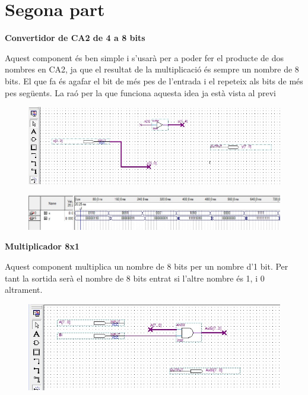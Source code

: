 \documentclass[12pt, a4papre]{article}
\begin{document}
	\newpage
	\section{Segona part}
	\textbf{\large{Convertidor de CA2 de 4 a 8 bits}}
	
	Aquest component és ben simple i s'usarà per a poder fer el producte de dos nombres en CA2, ja que el resultat de la multiplicació és sempre un nombre de 8 bits. El que fa és agafar el bit de més pes de l'entrada i el repeteix als bits de més pes següents. La raó per la que funciona aquesta idea ja està vista al previ
	\begin{figure}[H]
		\begin{center}
		\includegraphics[width=150mm]{CA2_4_a_8.jpeg}
		\end{center}
	\end{figure}
	\begin{figure}[H]
		\begin{center}
		\includegraphics[width=150mm]{CA2_4A8simul.jpeg}
		\end{center}
	\end{figure}
	
	\textbf{\large{Multiplicador 8x1}}
	
	Aquest component multiplica un nombre de 8 bits per un nombre d'1 bit. Per tant la sortida serà el nombre de 8 bits entrat si l'altre nombre és 1, i 0 altrament.
	
	\begin{figure}[H]
		\begin{center}
		\includegraphics[width=150mm]{MULT8x1.jpeg}
		\end{center}
	\end{figure}
	
\end{document}
